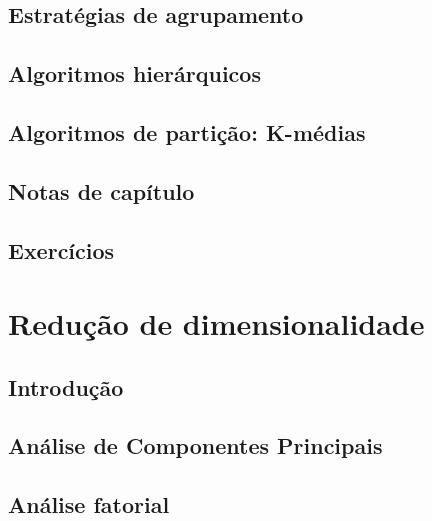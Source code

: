\documentclass[
]{latex/krantz}
\theoremstyle{definition}
\theoremstyle{definition}
\theoremstyle{definition}
\theoremstyle{definition}
\theoremstyle{remark}
\begin{document}
\hypertarget{estratuxe9gias-de-agrupamento}{%
\section{Estratégias de agrupamento}\label{estratuxe9gias-de-agrupamento}}

\hypertarget{algoritmos-hieruxe1rquicos}{%
\section{Algoritmos hierárquicos}\label{algoritmos-hieruxe1rquicos}}

\hypertarget{algoritmos-de-partiuxe7uxe3o-k-muxe9dias}{%
\section{Algoritmos de partição: K-médias}\label{algoritmos-de-partiuxe7uxe3o-k-muxe9dias}}

\hypertarget{notas-de-capuxedtulo-11}{%
\section{Notas de capítulo}\label{notas-de-capuxedtulo-11}}

\hypertarget{exercuxedcios-11}{%
\section{Exercícios}\label{exercuxedcios-11}}

\hypertarget{reduuxe7uxe3o-de-dimensionalidade}{%
\chapter{Redução de dimensionalidade}\label{reduuxe7uxe3o-de-dimensionalidade}}

\hypertarget{introduuxe7uxe3o-12}{%
\section{Introdução}\label{introduuxe7uxe3o-12}}

\hypertarget{anuxe1lise-de-componentes-principais}{%
\section{Análise de Componentes Principais}\label{anuxe1lise-de-componentes-principais}}

\hypertarget{anuxe1lise-fatorial}{%
\section{Análise fatorial}\label{anuxe1lise-fatorial}}
\end{document}
